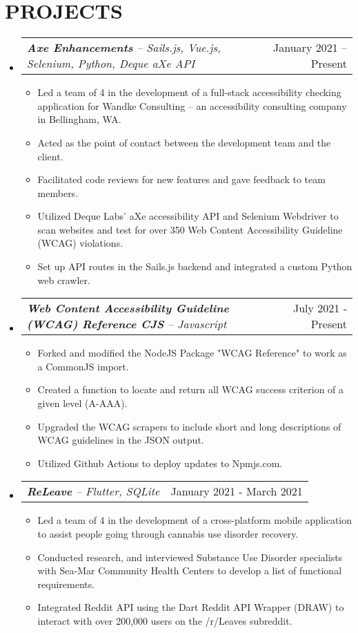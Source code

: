 \documentclass[letterpaper,11pt]{article}
\makeatletter
\newcommand{\resumeItem}[1]{
  \item\small{
    {#1 \vspace{-1pt}}
  }
}
\newcommand{\resumeProjectHeading}[2]{
    \item
    \begin{tabular*}{\textwidth}{l@{\extracolsep{\fill}}r}
        \textit{\small#1} & {\color{dark-grey}\small #2}\vspace{2pt} \\
    \end{tabular*}\vspace{-5pt}
}
\newcommand{\resumeSubHeadingListStart}{\begin{itemize}[leftmargin=0in, label={}]}
\newcommand{\resumeSubHeadingListEnd}{\end{itemize}}
\newcommand{\resumeItemListStart}{\begin{itemize}}
\newcommand{\resumeItemListEnd}{\end{itemize}\vspace{0pt}}
\makeatother
\begin{document}

\section{PROJECTS}
    \resumeSubHeadingListStart
      \resumeProjectHeading
      {\textbf{Axe Enhancements} -- Sails.js, Vue.js, Selenium, Python, Deque aXe API}{January 2021 -- Present}
          \resumeItemListStart
            \resumeItem{Led a team of 4 in the development of a full-stack accessibility checking application for Wandke Consulting -- an accessibility consulting company in Bellingham, WA.}
            \resumeItem{Acted as the point of contact between the development team and the client.}
            \resumeItem{Facilitated code reviews for new features and gave feedback to team members.}
            \resumeItem{Utilized Deque Labs’ aXe accessibility API and Selenium Webdriver to scan websites and test for over 350 Web Content Accessibility Guideline (WCAG) violations.}
            \resumeItem{Set up API routes in the Sails.js backend and integrated a custom Python web crawler.}
          \resumeItemListEnd
          
        \resumeProjectHeading
         {\textbf{Web Content Accessibility Guideline (WCAG) Reference CJS} -- Javascript}{July 2021 - Present}
          \resumeItemListStart
            \resumeItem{Forked and modified the NodeJS Package "WCAG Reference" to work as a CommonJS import.}
            \resumeItem{Created a function to locate and return all WCAG success criterion of a given level (A-AAA).}
            \resumeItem{Upgraded the WCAG scrapers to include short and long descriptions of WCAG guidelines in the JSON output.}
            \resumeItem{Utilized Github Actions to deploy updates to Npmjs.com.}
          \resumeItemListEnd

          
        \resumeProjectHeading
          {\textbf{ReLeave} -- Flutter, SQLite}{January 2021 - March 2021}  
          \resumeItemListStart
            \resumeItem{Led a team of 4 in the development of a cross-platform mobile application to assist people going through cannabis use disorder recovery.}
            \resumeItem{Conducted research, and interviewed Substance Use Disorder specialists with Sea-Mar Community Health Centers to develop a list of functional requirements.}
            \resumeItem{Integrated Reddit API using the Dart Reddit API Wrapper (DRAW) to interact with over 200,000 users on the /r/Leaves subreddit.}
          \resumeItemListEnd
    \resumeSubHeadingListEnd
\end{document}
